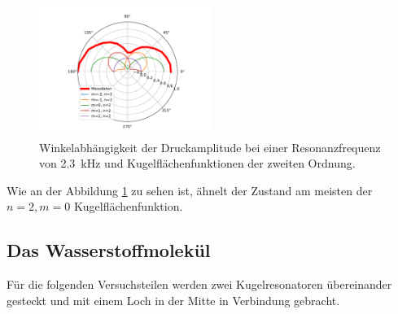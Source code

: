\begin{figure}
    \centering
    \includegraphics[width=0.5\textwidth]{figure/9mmZwischenring_n2.pdf}
    \caption{Winkelabhängigkeit der Druckamplitude bei einer Resonanzfrequenz von \SI{2.3}{\kilo\hertz} und Kugelflächenfunktionen der zweiten Ordnung.}
    \label{fig:9mmZwischenring_n2}
\end{figure}
\FloatBarrier
Wie an der Abbildung \ref{fig:9mmZwischenring_n2} zu sehen ist, ähnelt der Zustand am meisten der $n=2,m=0$ Kugelflächenfunktion.
\subsection{Das Wasserstoffmolekül}
Für die folgenden Versuchsteilen werden zwei Kugelresonatoren übereinander gesteckt und mit einem Loch in der Mitte in Verbindung gebracht.
